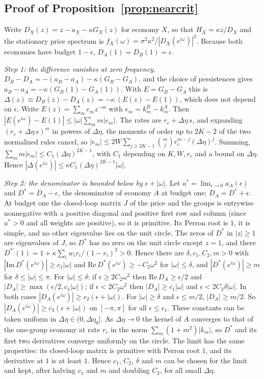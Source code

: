 \subsection{Proof of Proposition~\ref{prop:nearcrit}}\label{app:nearcrit}

Write $D_X(z)=z-a_X-\kappa G_X(z)$ for economy $X$, so that $H_X=\kappa z/D_X$ and the stationary price spectrum is $f_X(\omega)=\sigma^2\kappa^2/|D_X(e^{i\omega})|^2$. Because both economies have budget $1-\epsilon$, $D_A(1)=D_B(1)=\epsilon$.

\emph{Step 1: the difference vanishes at zero frequency.} $D_B-D_A=-(a_B-a_A)-\kappa(G_B-G_A)$, and the choice of persistences gives $a_B-a_A=-\kappa(G_B(1)-G_A(1))$. With $E=G_B-G_A$ this is $\Delta(z)\equiv D_B(z)-D_A(z)=-\kappa\,(E(z)-E(1))$, which does not depend on $\epsilon$. Write $E(z)=\sum_me_mz^{-m}$ with $e_m=k^B_m-k^A_m$. Then $|E(e^{i\omega})-E(1)|\le|\omega|\sum_mm|e_m|$. The rates are $r_c+\Delta\eta\,s$, and expanding $(r_c+\Delta\eta\,s)^m$ in powers of $\Delta\eta$, the moments of order up to $2K-2$ of the two normalized rules cancel, so $|e_m|\le2W\sum_{j\ge2K-1}\binom mj r_c^{m-j}(\Delta\eta)^j$. Summing, $\sum_mm|e_m|\le C_1(\Delta\eta)^{2K-1}$, with $C_1$ depending on $K,W,r_c$ and a bound on $\Delta\eta$. Hence $|\Delta(e^{i\omega})|\le\kappa C_1(\Delta\eta)^{2K-1}|\omega|$.

\emph{Step 2: the denominator is bounded below by $\epsilon+|\omega|$.} Let $a^*=\lim_{\epsilon\to0}a_A(\epsilon)$ and $D^*=D_A-\epsilon$, the denominator of economy $A$ at budget one; $D_A=D^*+\epsilon$. At budget one the closed-loop matrix $J$ of the price and the groups is entrywise nonnegative with a positive diagonal and positive first row and column (since $a^*>0$ and all weights are positive), so it is primitive. Its Perron root is $1$, it is simple, and no other eigenvalue lies on the unit circle. The zeros of $D^*$ in $|z|\ge1$ are eigenvalues of $J$, so $D^*$ has no zero on the unit circle except $z=1$, and there $D^{*\prime}(1)=1+\kappa\sum_iw_ir_i/(1-r_i)^2>0$. Hence there are $\delta,c_1,C_2,m>0$ with $|\mathrm{Im}\,D^*(e^{i\omega})|\ge c_1|\omega|$ and $\mathrm{Re}\,D^*(e^{i\omega})\ge-C_2\omega^2$ for $|\omega|\le\delta$, and $|D^*(e^{i\omega})|\ge m$ for $\delta\le|\omega|\le\pi$. For $|\omega|\le\delta$: if $\epsilon\ge2C_2\omega^2$ then $\mathrm{Re}\,D_A\ge\epsilon/2$ and $|D_A|\ge\max(\epsilon/2,c_1|\omega|)$; if $\epsilon<2C_2\omega^2$ then $|D_A|\ge c_1|\omega|$ and $\epsilon<2C_2\delta|\omega|$. In both cases $|D_A(e^{i\omega})|\ge c_2(\epsilon+|\omega|)$. For $|\omega|\ge\delta$ and $\epsilon\le m/2$, $|D_A|\ge m/2$. So $|D_A(e^{i\omega})|\ge c_3(\epsilon+|\omega|)$ on $[-\pi,\pi]$ for all $\epsilon\le\epsilon_1$. These constants can be taken uniform in $\Delta\eta\in(0,\Delta\eta_0]$. As $\Delta\eta\to0$ the kernel of $A$ converges to that of the one-group economy at rate $r_c$ in the norm $\sum_m(1+m^2)|k_m|$, so $D^*$ and its first two derivatives converge uniformly on the circle. The limit has the same properties: its closed-loop matrix is primitive with Perron root $1$, and its derivative at $1$ is at least $1$. Hence $c_1$, $C_2$, $\delta$ and $m$ can be chosen for the limit and kept, after halving $c_1$ and $m$ and doubling $C_2$, for all small $\Delta\eta$.

